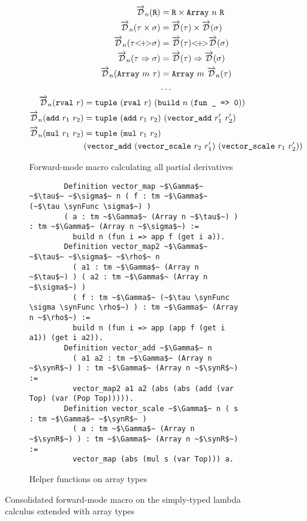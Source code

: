   \begin{figure}
    \centering
    \begin{subfigure}{1\textwidth}
      \begin{gather*}
        \begin{aligned}
          \overrightarrow{\mathcal{D}}_n(\texttt{R}) &= \texttt{R} \times \texttt{Array}\ n\ \texttt{R} \\
          \overrightarrow{\mathcal{D}}_n(\tau \times \sigma) &= \overrightarrow{\mathcal{D}}(\tau) \times \overrightarrow{\mathcal{D}}(\sigma) \\
          \overrightarrow{\mathcal{D}}_n(\tau {<}\!{+}\!{>} \sigma) &= \overrightarrow{\mathcal{D}}(\tau) {<}\!{+}\!{>} \overrightarrow{\mathcal{D}}(\sigma) \\
          \overrightarrow{\mathcal{D}}_n(\tau \Rightarrow \sigma) &= \overrightarrow{\mathcal{D}}(\tau) \Rightarrow \overrightarrow{\mathcal{D}}(\sigma) \\
          \overrightarrow{\mathcal{D}}_n(\texttt{Array}\ m\ \tau) &= \texttt{Array}\ m\ \overrightarrow{\mathcal{D}}_n(\tau)
        \end{aligned} \\
        \begin{gathered}
          \dots \\
          \begin{aligned}
            \overrightarrow{\mathcal{D}}_n(\texttt{rval}\ r) &= \texttt{tuple}\ (\texttt{rval}\ r)\ (\texttt{build}\ n\ (\texttt{fun \_ => 0})) \\
            \overrightarrow{\mathcal{D}}_n(\texttt{add}\ r_1\ r_2) &= \texttt{tuple}\ (\texttt{add}\ r_1\ r_2)\ (\texttt{vector\_add}\ r_1'\ r_2') \\
            \overrightarrow{\mathcal{D}}_n(\texttt{mul}\ r_1\ r_2) &= \texttt{tuple}\ (\texttt{mul}\ r_1\ r_2)\ \\&(\texttt{vector\_add}\ (\texttt{vector\_scale}\ r_2\ r_1')\ (\texttt{vector\_scale}\ r_1\ r_2'))
          \end{aligned}
        \end{gathered}
      \end{gather*}
      \caption{Forward-mode macro calculating all partial derivatives}
    \end{subfigure}
    \begin{subfigure}{1\textwidth}
      \begin{verbatim}
        Definition vector_map ~$\Gamma$~ ~$\tau$~ ~$\sigma$~ n ( f : tm ~$\Gamma$~ (~$\tau \synFunc \sigma$~) )
        ( a : tm ~$\Gamma$~ (Array n ~$\tau$~) ) : tm ~$\Gamma$~ (Array n ~$\sigma$~) :=
          build n (fun i => app f (get i a)).
        Definition vector_map2 ~$\Gamma$~ ~$\tau$~ ~$\sigma$~ ~$\rho$~ n
          ( a1 : tm ~$\Gamma$~ (Array n ~$\tau$~) ) ( a2 : tm ~$\Gamma$~ (Array n ~$\sigma$~) )
          ( f : tm ~$\Gamma$~ (~$\tau \synFunc \sigma \synFunc \rho$~) ) : tm ~$\Gamma$~ (Array n ~$\rho$~) :=
          build n (fun i => app (app f (get i a1)) (get i a2)).
        Definition vector_add ~$\Gamma$~ n
          ( a1 a2 : tm ~$\Gamma$~ (Array n ~$\synR$~) ) : tm ~$\Gamma$~ (Array n ~$\synR$~) :=
          vector_map2 a1 a2 (abs (abs (add (var Top) (var (Pop Top))))).
        Definition vector_scale ~$\Gamma$~ n ( s : tm ~$\Gamma$~ ~$\synR$~ )
          ( a : tm ~$\Gamma$~ (Array n ~$\synR$~) ) : tm ~$\Gamma$~ (Array n ~$\synR$~) :=
          vector_map (abs (mul s (var Top))) a.
      \end{verbatim}
      \caption{Helper functions on array types}
    \end{subfigure}
    \caption{Consolidated forward-mode macro on the simply-typed lambda calculus extended with array types}
    \label{fig:forward_mode_cont}
  \end{figure}

